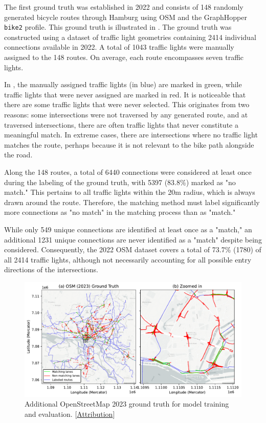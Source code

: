 The first ground truth was established in 2022 and consists of 148 randomly generated bicycle routes through Hamburg using OSM and the GraphHopper \texttt{bike2} profile. This ground truth is illustrated in . The ground truth was constructed using a dataset of traffic light geometries containing 2414 individual connections available in 2022. A total of 1043 traffic lights were manually assigned to the 148 routes. On average, each route encompasses seven traffic lights.

In , the manually assigned traffic lights (in blue) are marked in green, while traffic lights that were never assigned are marked in red. It is noticeable that there are some traffic lights that were never selected. This originates from two reasons: some intersections were not traversed by any generated route, and at traversed intersections, there are often traffic lights that never constitute a meaningful match. In extreme cases, there are intersections where no traffic light matches the route, perhaps because it is not relevant to the bike path alongside the road.

Along the 148 routes, a total of 6440 connections were considered at least once during the labeling of the ground truth, with 5397 (83.8\%) marked as "no match." This pertains to all traffic lights within the 20m radius, which is always drawn around the route. Therefore, the matching method must label significantly more connections as "no match" in the matching process than as "match."

While only 549 unique connections are identified at least once as a "match," an additional 1231 unique connections are never identified as a "match" despite being considered. Consequently, the 2022 OSM dataset covers a total of 73.7\% (1780) of all 2414 traffic lights, although not necessarily accounting for all possible entry directions of the intersections.

\begin{figure}[htbp]
\centering 
\includegraphics[width=\linewidth]{images/matching-ground-truth-osm.pdf}
\caption{Additional OpenStreetMap 2023 ground truth for model training and evaluation. [\hyperref[attribution]{Attribution}]}
\label{fig:matching-ground-truth-osm}
\end{figure}

